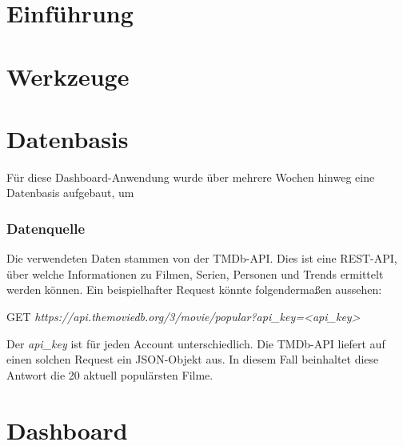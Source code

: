 \documentclass[12pt]{article}
\begin{document}
\renewcommand{\mytitle}{Ausarbeitung eines Dashboards mit PowerBI zum Vergleich\\der Corona-Zahlen mit den wöchentlichen TMDb-Trends}%
\renewcommand{\myauthor}{Vanessa Kriebel, Julia Groeniger, Paul Schäfer,\\Timo Stovermann, Bastian Wynk}%
\renewcommand{\headheight}{40pt}%



\frontmatter%


\printabbreviations%
\clearpage
\renewcommand{\plaintitle}{Abbildungsverzeichnis}
{\def\makebox[#1][#2]#3{#3}%
\listoffigures
}
\clearpage
\renewcommand{\plaintitle}{Tabellenverzeichnis}
{\def\makebox[#1][#2]#3{#3}%
\listoftables
}
\clearpage
\renewcommand{\plaintitle}{Inhaltsverzeichnis}%
{\def\makebox[#1][#2]#3{#3}%
	\tableofcontents
}


\clearpage
\mainmatter%

\part{Einführung}

\part{Werkzeuge}

\part{Datenbasis}
Für diese Dashboard-Anwendung wurde über mehrere Wochen hinweg eine Datenbasis aufgebaut, um
\section{Datenquelle}
Die verwendeten Daten stammen von der TMDb-API. Dies ist eine REST-API, über welche Informationen zu Filmen, Serien, Personen und Trends ermittelt werden können. Ein beispielhafter Request könnte folgendermaßen aussehen:
\begin{center}
GET \textit{https://api.themoviedb.org/3/movie/popular?api{\_}key=<api{\_}key>}
\end{center}
Der \textit{api{\_}key} ist für jeden Account unterschiedlich. Die TMDb-API liefert auf einen solchen Request ein JSON-Objekt aus. In diesem Fall beinhaltet diese Antwort die 20 aktuell populärsten Filme.
\part{Dashboard}
\end{document}
